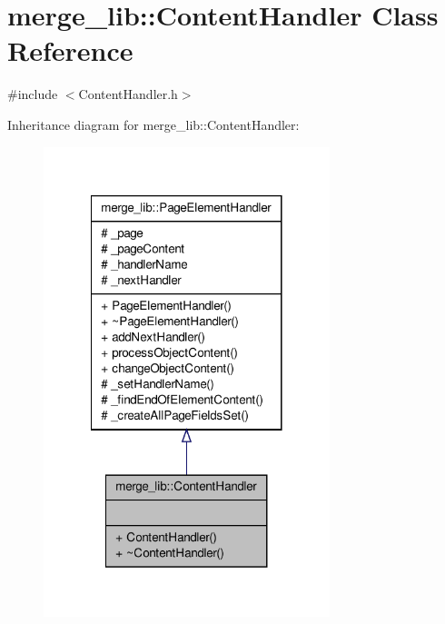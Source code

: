 \hypertarget{classmerge__lib_1_1_content_handler}{\section{merge\-\_\-lib\-:\-:Content\-Handler Class Reference}
\label{d5/d06/classmerge__lib_1_1_content_handler}
}


{\ttfamily \#include $<$Content\-Handler.\-h$>$}



Inheritance diagram for merge\-\_\-lib\-:\-:Content\-Handler\-:
\nopagebreak
\begin{figure}[H]
\begin{center}
\leavevmode
\includegraphics[width=236pt]{dc/db7/classmerge__lib_1_1_content_handler__inherit__graph}
\end{center}
\end{figure}


